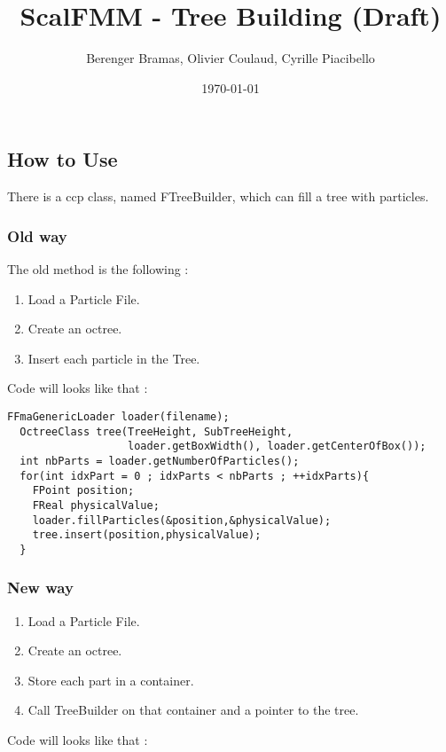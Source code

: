 \documentclass[12pt,letterpaper,titlepage]{article}
\author{Berenger Bramas, Olivier Coulaud, Cyrille Piacibello}
\title{ScalFMM - Tree Building (Draft)}
\date{\today}
\begin{document}
\maketitle{}

\subsection*{How to Use}

There is a ccp class, named FTreeBuilder, which can fill a tree with
particles.

\subsubsection*{Old way}

The old method is the following :
\begin{enumerate}
  \item Load a Particle File.
  \item Create an octree.
  \item Insert each particle in the Tree.
\end{enumerate}

Code will looks like that :
\begin{lstlisting}[frame=single]
  FFmaGenericLoader loader(filename);
  OctreeClass tree(TreeHeight, SubTreeHeight,
                   loader.getBoxWidth(), loader.getCenterOfBox());
  int nbParts = loader.getNumberOfParticles();
  for(int idxPart = 0 ; idxParts < nbParts ; ++idxParts){
    FPoint position;
    FReal physicalValue;
    loader.fillParticles(&position,&physicalValue);
    tree.insert(position,physicalValue);
  }
\end{lstlisting}


\subsubsection*{New way}

\begin{enumerate}
  \item Load a Particle File.
  \item Create an octree.
  \item Store each part in a container.
  \item Call TreeBuilder on that container and a pointer to the tree.
\end{enumerate}

\newpage

Code will looks like that :
\end{document}
